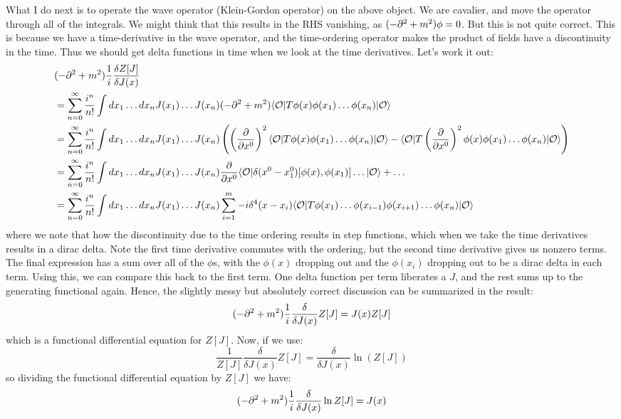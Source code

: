What I do next is to operate the wave operator (Klein-Gordon operator) on the above object. We are cavalier, and move the operator through all of the integrals. We might think that this results in the RHS vanishing, as $(-\p^2 + m^2)\phi = 0$. But this is not quite correct. This is because we have a time-derivative in the wave operator, and the time-ordering operator makes the product of fields have a discontinuity in the time. Thus we should get delta functions in time when we look at the time derivatives. Let's work it out:
\begin{equation}
    \begin{split}
        &(-\p^2 + m^2)\frac{1}{i}\frac{\delta Z[J]}{\delta J(x)} 
        \\ &= \sum_{n=0}^\infty \frac{i^n}{n!} \int dx_1 \ldots dx_n J(x_1)\ldots J(x_n) (-\p^2 + m^2)\bra{\O}T\phi(x)\phi(x_1) \ldots \phi(x_n)\ket{\O}
        \\ &= \sum_{n=0}^\infty \frac{i^n}{n!}\int dx_1 \ldots dx_n J(x_1) \ldots J(x_n)\left(\left(\dpd{}{x^0}\right)^2\bra{\O}T\phi(x)\phi(x_1) \ldots \phi(x_n)\ket{\O} - \bra{\O}T\left(\dpd{}{x^0}\right)^2 \phi(x)\phi(x_1) \ldots \phi(x_n)\ket{\O}\right)
        \\ &= \sum_{n=0}^\infty \frac{i^n}{n!} \int dx_1 \ldots dx_n J(x_1)\ldots J(x_n)\dpd{}{x^0}\bra{\O}\delta(x^0 - x_1^0)[\phi(x), \phi(x_1)] \ldots \ket{\O} + \ldots 
        \\ &= \sum_{n=0}^\infty \frac{i^n}{n!} \int dx_1 \ldots dx_n J(x_1)\ldots J(x_n)\sum_{i=1}^m -i\delta^4(x - x_i) \bra{\O}T\phi(x_1) \ldots \phi(x_{i-1})\phi(x_{i+1}) \ldots \phi(x_n)\ket{\O}
    \end{split}
\end{equation}
where we note that how the discontinuity due to the time ordering results in step functions, which when we take the time derivatives results in a dirac delta. Note the first time derivative commutes with the ordering, but the second time derivative gives us nonzero terms. The final expression has a sum over all of the $\phi$s, with the $\phi(x)$ dropping out and the $\phi(x_i)$ dropping out to be a dirac delta in each term. Using this, we can compare this back to the first term. One delta function per term liberates a $J$, and the rest sums up to the generating functional again. Hence, the slightly messy but absolutely correct discussion can be summarized in the result:
\begin{equation}
    (-\partial^2 + m^2)\frac{1}{i}\frac{\delta}{\delta J(x)}Z[J] = J(x)Z[J]
\end{equation}
which is a functional differential equation for $Z[J]$. Now, if we use:
\begin{equation}
    \frac{1}{Z[J]}\frac{\delta}{\delta J(x)}Z[J] = \frac{\delta}{\delta J(x)}\ln(Z[J])
\end{equation}
so dividing the functional differential equation by $Z[J]$ we have:
\begin{equation}
    (-\partial^2 + m^2)\frac{1}{i}\frac{\delta}{\delta J(x)}\ln Z[J] = J(x)
\end{equation}

